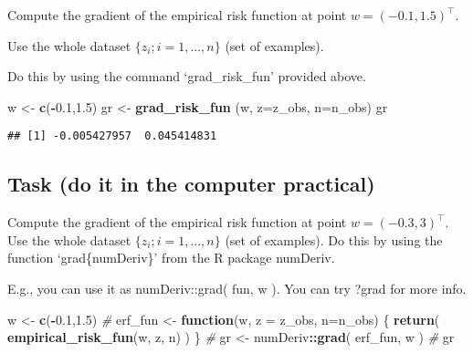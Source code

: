 \documentclass[
]{article}
\newenvironment{Shaded}{\begin{snugshade}}{\end{snugshade}}
\newcommand{\CommentTok}[1]{\textcolor[rgb]{0.56,0.35,0.01}{\textit{#1}}}
\newcommand{\ControlFlowTok}[1]{\textcolor[rgb]{0.13,0.29,0.53}{\textbf{#1}}}
\newcommand{\DataTypeTok}[1]{\textcolor[rgb]{0.13,0.29,0.53}{#1}}
\newcommand{\FloatTok}[1]{\textcolor[rgb]{0.00,0.00,0.81}{#1}}
\newcommand{\KeywordTok}[1]{\textcolor[rgb]{0.13,0.29,0.53}{\textbf{#1}}}
\newcommand{\NormalTok}[1]{#1}
\newcommand{\OperatorTok}[1]{\textcolor[rgb]{0.81,0.36,0.00}{\textbf{#1}}}
\newcommand{\StringTok}[1]{\textcolor[rgb]{0.31,0.60,0.02}{#1}}
\begin{document}
Compute the gradient of the empirical risk function at point
\(w=(-0.1,1.5)^\top\).

Use the whole dataset \(\{z_{i};i=1,...,n\}\) (set of examples).

Do this by using the command `grad\_risk\_fun' provided above.

\begin{Shaded}
\begin{Highlighting}[]
\NormalTok{w \textless{}{-}}\StringTok{ }\KeywordTok{c}\NormalTok{(}\OperatorTok{{-}}\FloatTok{0.1}\NormalTok{,}\FloatTok{1.5}\NormalTok{)}
\NormalTok{gr \textless{}{-}}\StringTok{ }\KeywordTok{grad\_risk\_fun}\NormalTok{ (w, }\DataTypeTok{z=}\NormalTok{z\_obs, }\DataTypeTok{n=}\NormalTok{n\_obs) }
\NormalTok{gr}
\end{Highlighting}
\end{Shaded}

\begin{verbatim}
## [1] -0.005427957  0.045414831
\end{verbatim}

\hypertarget{task-do-it-in-the-computer-practical-1}{%
\subsection{Task (do it in the computer
practical)}\label{task-do-it-in-the-computer-practical-1}}

Compute the gradient of the empirical risk function at point
\(w=(-0.3,3)^\top\). Use the whole dataset \(\{z_{i};i=1,...,n\}\) (set
of examples). Do this by using the function `grad\{numDeriv\}' from the
R package numDeriv.

E.g., you can use it as numDeriv::grad( fun, w ). You can try ?grad for
more info.

\begin{Shaded}
\begin{Highlighting}[]
\NormalTok{w \textless{}{-}}\StringTok{ }\KeywordTok{c}\NormalTok{(}\OperatorTok{{-}}\FloatTok{0.1}\NormalTok{,}\FloatTok{1.5}\NormalTok{)}
\CommentTok{\#}
\NormalTok{erf\_fun \textless{}{-}}\StringTok{ }\ControlFlowTok{function}\NormalTok{(w, }\DataTypeTok{z =}\NormalTok{ z\_obs, }\DataTypeTok{n=}\NormalTok{n\_obs) \{}
  \KeywordTok{return}\NormalTok{( }\KeywordTok{empirical\_risk\_fun}\NormalTok{(w, z, n) ) }
\NormalTok{\}}
\CommentTok{\#}
\NormalTok{gr \textless{}{-}}\StringTok{ }\NormalTok{numDeriv}\OperatorTok{::}\KeywordTok{grad}\NormalTok{( erf\_fun, w )}
\CommentTok{\#}
\NormalTok{gr}
\end{Highlighting}
\end{Shaded}
\end{document}
